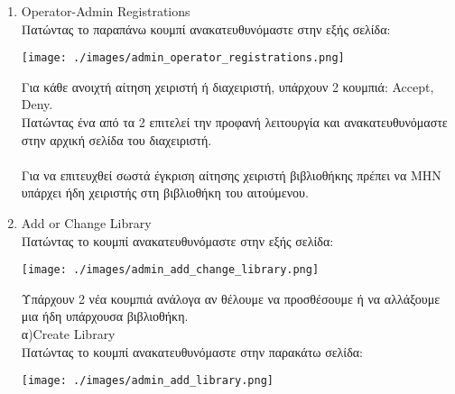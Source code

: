 \documentclass[14pt]{report}
\begin{document}
	\begin{enumerate}
		\newpage
		\hypertarget{a-operator-registrations}{}
		\item Operator-Admin Registrations \\
		Πατώντας το παραπάνω κουμπί ανακατευθυνόμαστε στην εξής σελίδα: \\
		
		\vspace{\baselineskip}
		
		\texttt{[image: ./images/admin\_operator\_registrations.png]}
		
		\vspace{\baselineskip}
		
		Για κάθε ανοιχτή αίτηση χειριστή ή διαχειριστή, υπάρχουν 2 κουμπιά: Accept, Deny. \\
		Πατώντας ένα από τα 2 επιτελεί την προφανή λειτουργία και ανακατευθυνόμαστε στην αρχική σελίδα του διαχειριστή. \\ \\
		Για να επιτευχθεί σωστά έγκριση αίτησης χειριστή βιβλιοθήκης πρέπει να ΜΗΝ υπάρχει ήδη χειριστής στη βιβλιοθήκη του αιτούμενου. \\
		
		\newpage
		\hypertarget{a-add-change-library}{}
		\item Add or Change Library \\
		Πατώντας το κουμπί ανακατευθυνόμαστε στην εξής σελίδα: \\
		
		\vspace{\baselineskip}
		
		\texttt{[image: ./images/admin\_add\_change\_library.png]}
		
		\vspace{\baselineskip}
		
		Υπάρχουν 2 νέα κουμπιά ανάλογα αν θέλουμε να προσθέσουμε ή να αλλάξουμε μια ήδη υπάρχουσα βιβλιοθήκη. \\
		
		\newpage
		α)Create Library \\
		Πατώντας το κουμπί ανακατευθυνόμαστε στην παρακάτω σελίδα: \\
		
		\vspace{\baselineskip}
		
		\texttt{[image: ./images/admin\_add\_library.png]}
		
		\vspace{\baselineskip}
		

\end{enumerate}
\end{document}
